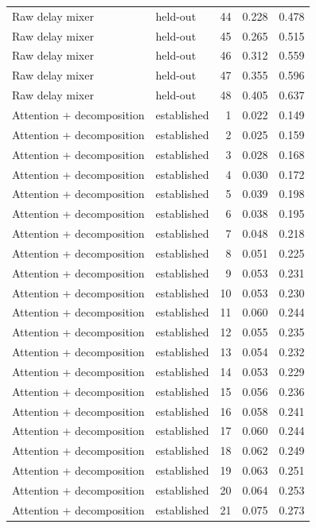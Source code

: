 \begin{tabular}{llrrr}
Raw delay mixer & held-out & 44 & 0.228 & 0.478 \\
Raw delay mixer & held-out & 45 & 0.265 & 0.515 \\
Raw delay mixer & held-out & 46 & 0.312 & 0.559 \\
Raw delay mixer & held-out & 47 & 0.355 & 0.596 \\
Raw delay mixer & held-out & 48 & 0.405 & 0.637 \\
Attention + decomposition & established & 1 & 0.022 & 0.149 \\
Attention + decomposition & established & 2 & 0.025 & 0.159 \\
Attention + decomposition & established & 3 & 0.028 & 0.168 \\
Attention + decomposition & established & 4 & 0.030 & 0.172 \\
Attention + decomposition & established & 5 & 0.039 & 0.198 \\
Attention + decomposition & established & 6 & 0.038 & 0.195 \\
Attention + decomposition & established & 7 & 0.048 & 0.218 \\
Attention + decomposition & established & 8 & 0.051 & 0.225 \\
Attention + decomposition & established & 9 & 0.053 & 0.231 \\
Attention + decomposition & established & 10 & 0.053 & 0.230 \\
Attention + decomposition & established & 11 & 0.060 & 0.244 \\
Attention + decomposition & established & 12 & 0.055 & 0.235 \\
Attention + decomposition & established & 13 & 0.054 & 0.232 \\
Attention + decomposition & established & 14 & 0.053 & 0.229 \\
Attention + decomposition & established & 15 & 0.056 & 0.236 \\
Attention + decomposition & established & 16 & 0.058 & 0.241 \\
Attention + decomposition & established & 17 & 0.060 & 0.244 \\
Attention + decomposition & established & 18 & 0.062 & 0.249 \\
Attention + decomposition & established & 19 & 0.063 & 0.251 \\
Attention + decomposition & established & 20 & 0.064 & 0.253 \\
Attention + decomposition & established & 21 & 0.075 & 0.273 \\

\end{tabular}
